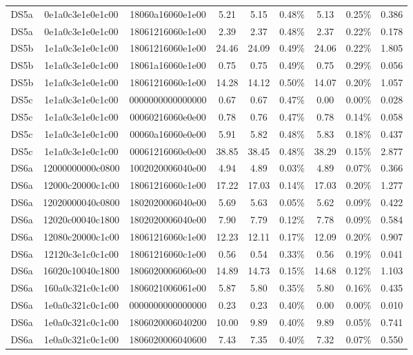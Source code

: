 \begin{tabular}{|c|c c|c|c c|c c|c|}
  DS5a & 0e1a0c3e1e0e1c00 & 18060a16060e1e00 & 5.21 & 5.15 & 0.48\% & 5.13 & 0.25\% & 0.386 \\
  DS5a & 0e1a0c3e1e0e1c00 & 18061216060e1e00 & 2.39 & 2.37 & 0.48\% & 2.37 & 0.22\% & 0.178 \\
  DS5b & 1e1a0c3e1e0c1c00 & 18061216060e1e00 & 24.46 & 24.09 & 0.49\% & 24.06 & 0.22\% & 1.805 \\
  DS5b & 1e1a0c3e1e0c1c00 & 18061a16060e1e00 & 0.75 & 0.75 & 0.49\% & 0.75 & 0.29\% & 0.056 \\
  DS5b & 1e1a0c3e1e0e1c00 & 18061216060e1e00 & 14.28 & 14.12 & 0.50\% & 14.07 & 0.20\% & 1.057 \\
  DS5c & 1e1a0c3e1e0c1c00 & 0000000000000000 & 0.67 & 0.67 & 0.47\% & 0.00 & 0.00\% & 0.028 \\
  DS5c & 1e1a0c3e1e0c1c00 & 00060216060e0e00 & 0.78 & 0.76 & 0.47\% & 0.78 & 0.14\% & 0.058 \\
  DS5c & 1e1a0c3e1e0c1c00 & 00060a16060e0e00 & 5.91 & 5.82 & 0.48\% & 5.83 & 0.18\% & 0.437 \\
  DS5c & 1e1a0c3e1e0c1c00 & 00061216060e0e00 & 38.85 & 38.45 & 0.48\% & 38.29 & 0.15\% & 2.877 \\
  DS6a & 12000000000c0800 & 1002020006040e00 & 4.94 & 4.89 & 0.03\% & 4.89 & 0.07\% & 0.366 \\
  DS6a & 12000c20000c1c00 & 18061216060c1e00 & 17.22 & 17.03 & 0.14\% & 17.03 & 0.20\% & 1.277 \\
  DS6a & 12020000040c0800 & 1802020006040e00 & 5.69 & 5.63 & 0.05\% & 5.62 & 0.09\% & 0.422 \\
  DS6a & 12020c00040c1800 & 1802020006040e00 & 7.90 & 7.79 & 0.12\% & 7.78 & 0.09\% & 0.584 \\
  DS6a & 12080c20000c1c00 & 18061216060c1e00 & 12.23 & 12.11 & 0.17\% & 12.09 & 0.20\% & 0.907 \\
  DS6a & 12120c3e1c0c1c00 & 18061216060c1e00 & 0.56 & 0.54 & 0.33\% & 0.56 & 0.19\% & 0.041 \\
  DS6a & 16020c10040c1800 & 1806020006060e00 & 14.89 & 14.73 & 0.15\% & 14.68 & 0.12\% & 1.103 \\
  DS6a & 160a0c321c0c1c00 & 1806021006061e00 & 5.87 & 5.80 & 0.35\% & 5.80 & 0.16\% & 0.435 \\
  DS6a & 1e0a0c321c0c1c00 & 0000000000000000 & 0.23 & 0.23 & 0.40\% & 0.00 & 0.00\% & 0.010 \\
  DS6a & 1e0a0c321c0c1c00 & 1806020006040200 & 10.00 & 9.89 & 0.40\% & 9.89 & 0.05\% & 0.741 \\
  DS6a & 1e0a0c321c0c1c00 & 1806020006040600 & 7.43 & 7.35 & 0.40\% & 7.32 & 0.07\% & 0.550 \\

\end{tabular}
